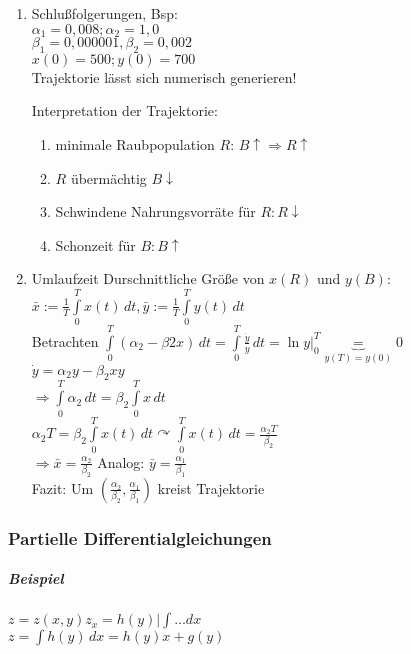 \documentclass[a4paper]{scrartcl}
\begin{document}
\begin{enumerate}
\item Schlußfolgerungen, Bsp:\\
$\alpha_1 = 0,008; \alpha_2 = 1,0$\\
$\beta_1 = 0,000001, \beta_2 = 0,002$\\
$x(0) = 500; y(0) = 700$\\
Trajektorie lässt sich numerisch generieren!


Interpretation der Trajektorie:
\begin{enumerate}
\item minimale Raubpopulation $R$: $B\uparrow \Rightarrow R \uparrow$
\item $R$ übermächtig $B \downarrow$
\item Schwindene Nahrungsvorräte für $R: R \downarrow$
\item Schonzeit für $B: B \uparrow$
\end{enumerate}

\item Umlaufzeit
Durschnittliche Größe von $x(R)$ und $y(B)$:
$\bar{x} := \frac{1}{T} \int\limits_0^T x(t) \, dt , \bar{y} := \frac{1}{T} \int\limits_0^T y(t) \, dt$\\
Betrachten $\int\limits_0^T (\alpha_2 - \beta2 x ) \, dt = \int\limits_0^T \frac{\dot{y}}{y} \, dt = \ln y |_0^T \underbrace{=}_{y(T) = y(0)} 0$\\
$\dot{y} = \alpha_2 y - \beta_2 xy $\\
$\Rightarrow \int\limits_0^T \alpha_2 \, dt = \beta_2 \int\limits_0^T x \, dt$\\
$\alpha_2 T = \beta_2 \int\limits_0^T x(t) \, dt \curvearrowright \int\limits_0^T x(t) \, dt = \frac{\alpha_2 T}{\beta_2}$\\
$\Rightarrow \bar{x} = \frac{\alpha_2}{\beta_2}$ Analog: $\bar{y} = \frac{\alpha_1}{\beta_1}$\\
Fazit: Um $(\frac{\alpha_2}{\beta_2}, \frac{\alpha_1}{\beta_1})$ kreist Trajektorie

\end{enumerate}


\subsubsection{Partielle Differentialgleichungen}%

\subparagraph{Beispiel} $z=z(x,y) z_x = h(y) | \int \dots dx$\\
$z= \int h(y) \, dx = h(y) x + g(y)$
\end{document}

